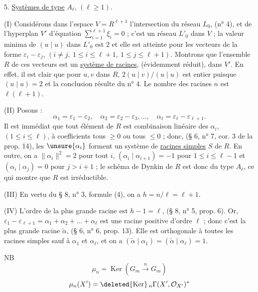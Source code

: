 5. \uline{Systèmes de type} $A_\ell$, $(\ell\geq1)$.

(I) Considérons dans l'espace $V=R^{\ell+1}$ l'intersection du réseau $L_0$, (n° 4), et de l'hyperplan $V'$ d'équation $\sum_{i=1}^{\ell+1}\xi_i=0$ ; c'est un réseau $L'_0$ dans $V$ ; la valeur minima de $(u\mid u)$ dans $L'_0$ est 2 et elle est atteinte pour les vecteurs de la forme $\varepsilon_i-\varepsilon_j$, $(i\ne j,\ 1\leq i\leq\ell+1,\ 1\leq j\leq\ell+1)$. Montrons que l'ensemble $R$ de ces vecteurs est un \uline{système de racines}, (évidemment réduit), dans $V'$. En effet, il est clair que pour $u,v$ dans $R$, $2(u\mid v)/(u\mid u)$ est entier puisque $(u\mid u)=2$ et la conclusion résulte du n° 4. Le nombre des racines $n$ est $\ell(\ell+1)$.

(II) Posons :
\[
\alpha_1=\varepsilon_1-\varepsilon_2,\quad
\alpha_2=\varepsilon_2-\varepsilon_3,\ldots,\quad
\alpha_\ell=\varepsilon_\ell-\varepsilon_{\ell+1}.
\]
Il est immédiat que tout élément de $R$ est combinaison linéaire des $\alpha_i$, $(1\leq i\leq\ell)$, à coefficients tous $\geq0$ ou tous $\leq0$ ; donc, (§ 6, n° 7, cor. 3 de la prop. 14), les $\unsure{\alpha_i}$ forment un système de \uline{racines simples} $S$ de $R$. En outre, on a $\|\alpha_i\|^2=2$ pour tout $i$, $(\alpha_i\mid\alpha_{i+1})=-1$ pour $1\leq i\leq\ell-1$ et $(\alpha_i\mid\alpha_j)=0$ pour $j>i+1$ ; le schéma de Dynkin de $R$ est donc du type $A_\ell$, ce qui montre que $R$ est irréductible.

(III) En vertu du § 8, n° 3, formule (4), on a $h=n/\ell=\ell+1$.

(IV) L'ordre de la plus grande racine est $h-1=\ell$, (§ 8, n° 5, prop. 6). Or, $\varepsilon_1-\varepsilon_{\ell+1}=\alpha_1+\alpha_2+\ldots+\alpha_\ell$ est une racine positive d'ordre $\ell$ ; donc c'est la plus grande racine $\tilde\alpha$, (§ 6, n° 6, prop. 13). Elle est orthogonale à toutes les racines simples sauf à $\alpha_1$ et $\alpha_\ell$, et on a $(\tilde\alpha\mid\alpha_1)=(\tilde\alpha\mid\alpha_\ell)=1$.



NB
\[
\mu_n=\operatorname{Ker}(G_m\xrightarrow{n}G_m)
\]
\[
\mu_n(X')=\deleted{\operatorname{Ker}}\,{}_n\Gamma(X',\mathcal O_{X'})^*
\]

